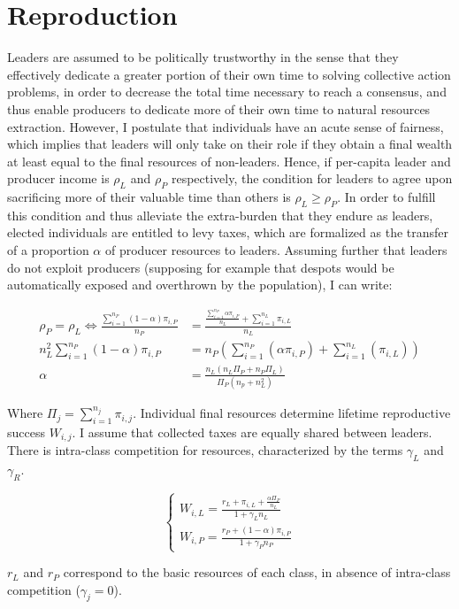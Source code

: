 \documentclass[a4paper]{article}
\begin{document}
\section{Reproduction}
\label{sec:repro}

Leaders are assumed to be politically trustworthy in the sense that they effectively dedicate a greater portion of their own time to solving collective action problems, in order to decrease the total time necessary to reach a consensus, and thus enable producers to dedicate more of their own time to natural resources extraction. However, I postulate that individuals have an acute sense of fairness, which implies that leaders will only take on their role if they obtain a final wealth at least equal to the final resources of non-leaders. Hence, if per-capita leader and producer income is $\rho_L$ and $\rho_P$ respectively, the condition for leaders to agree upon sacrificing more of their valuable time than others is $\rho_L\ge \rho_P$. In order to fulfill this condition and thus alleviate the extra-burden that they endure as leaders, elected individuals are entitled to levy taxes, which are formalized as the transfer of a proportion $\alpha$ of producer resources to leaders. Assuming further that leaders do not exploit producers (supposing for example that despots would be automatically exposed and overthrown by the population), I can write:

\begin{equation}
\begin{aligned}
\rho_P = \rho_L \Leftrightarrow\frac{\sum_{i=1}^{n_P}(1-\alpha)\pi_{i,P}}{n_P} &= \frac{\frac{\sum_{i=1}^{n_P}\alpha\pi_{i,P}}{n_L}+\sum_{i=1}^{n_L}\pi_{i,L}}{n_L}\\
n_L^2 \sum_{i=1}^{n_P}(1-\alpha)\pi_{i,P} &= n_P\left(\sum_{i=1}^{n_P}(\alpha\pi_{i,P}) + \sum_{i=1}^{n_L}(\pi_{i,L})\right)\\
\alpha &= \frac{n_L\left(n_L\Pi_P+n_P\Pi_L\right)}{\Pi_P\left(n_p+n_L^2\right)}
\end{aligned}
\end{equation}   

Where $\Pi_j=\sum_{i=1}^{n_j}\pi_{i,j}$. Individual final resources determine lifetime reproductive success $W_{i,j}$. I assume that collected taxes are equally shared between leaders. There is intra-class competition for resources, characterized by the terms $\gamma_L$ and $\gamma_R$.

\begin{equation}
\begin{cases}
W_{i,L}=\frac{r_L+\pi_{i,L}+\frac{\alpha\Pi_P}{n_L}}{1+\gamma_L n_L}\\
W_{i,P}=\frac{r_P+(1-\alpha)\pi_{i,P}}{1+\gamma_P n_P}
\end{cases}
\end{equation}

$r_L$ and $r_P$ correspond to the basic resources of each class, in absence of intra-class competition ($\gamma_j=0$).

%
%
\end{document}
